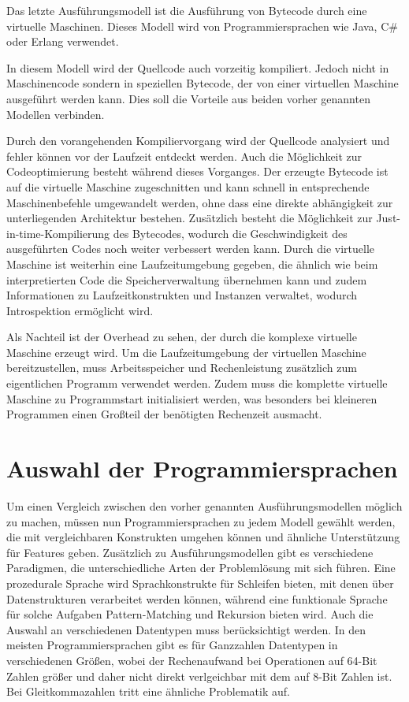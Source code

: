 \documentclass[11pt, parskip=half]{scrartcl}       %
\begin{document}
Das letzte Ausführungsmodell ist die Ausführung von Bytecode durch eine virtuelle Maschinen.
Dieses Modell wird von Programmiersprachen wie Java, C\# oder Erlang verwendet.

In diesem Modell wird der Quellcode auch vorzeitig kompiliert.
Jedoch nicht in Maschinencode sondern in speziellen Bytecode, der von einer virtuellen Maschine ausgeführt werden kann.
Dies soll die Vorteile aus beiden vorher genannten Modellen verbinden.

Durch den vorangehenden Kompiliervorgang wird der Quellcode analysiert und fehler können vor der Laufzeit entdeckt werden.
Auch die Möglichkeit zur Codeoptimierung besteht während dieses Vorganges.
Der erzeugte Bytecode ist auf die virtuelle Maschine zugeschnitten und kann schnell in entsprechende Maschinenbefehle umgewandelt werden, ohne dass eine direkte abhängigkeit zur unterliegenden Architektur bestehen.
Zusätzlich besteht die Möglichkeit zur Just-in-time-Kompilierung des Bytecodes, wodurch die Geschwindigkeit des ausgeführten Codes noch weiter verbessert werden kann.
Durch die virtuelle Maschine ist weiterhin eine Laufzeitumgebung gegeben, die ähnlich wie beim interpretierten Code die Speicherverwaltung übernehmen kann und zudem Informationen zu Laufzeitkonstrukten und Instanzen verwaltet, wodurch Introspektion ermöglicht wird.

Als Nachteil ist der Overhead zu sehen, der durch die komplexe virtuelle Maschine erzeugt wird.
Um die Laufzeitumgebung der virtuellen Maschine bereitzustellen, muss Arbeitsspeicher und Rechenleistung zusätzlich zum eigentlichen Programm verwendet werden.
Zudem muss die komplette virtuelle Maschine zu Programmstart initialisiert werden, was besonders bei kleineren Programmen einen Großteil der benötigten Rechenzeit ausmacht.


\section{Auswahl der Programmiersprachen}

Um einen Vergleich zwischen den vorher genannten Ausführungsmodellen möglich zu machen, müssen nun Programmiersprachen zu jedem Modell gewählt werden, die mit vergleichbaren Konstrukten umgehen können und ähnliche Unterstützung für Features geben.
Zusätzlich zu Ausführungsmodellen gibt es verschiedene Paradigmen, die unterschiedliche Arten der Problemlösung mit sich führen.
Eine prozedurale Sprache wird Sprachkonstrukte für Schleifen bieten, mit denen über Datenstrukturen verarbeitet werden können, während eine funktionale Sprache für solche Aufgaben Pattern-Matching und Rekursion bieten wird.
Auch die Auswahl an verschiedenen Datentypen muss berücksichtigt werden.
In den meisten Programmiersprachen gibt es für Ganzzahlen Datentypen in verschiedenen Größen, wobei der Rechenaufwand bei Operationen auf 64-Bit Zahlen größer und daher nicht direkt verlgeichbar mit dem auf 8-Bit Zahlen ist. Bei Gleitkommazahlen tritt eine ähnliche Problematik auf.
\end{document}
